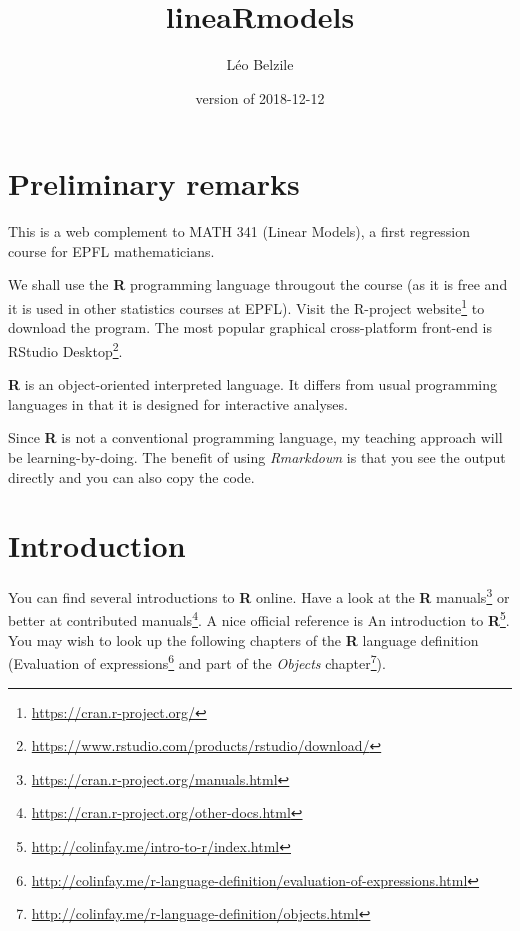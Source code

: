 \documentclass[]{book}
\title{lineaRmodels}
\author{Léo Belzile}
\date{version of 2018-12-12}
\let\rmarkdownfootnote\footnote%
\def\footnote{\protect\rmarkdownfootnote}
\renewcommand{\href}[2]{#2\footnote{\url{#1}}}
\theoremstyle{definition}
\theoremstyle{definition}
\theoremstyle{definition}
\theoremstyle{remark}
\begin{document}
\maketitle

{
\setcounter{tocdepth}{1}
\tableofcontents
}
\hypertarget{preliminary-remarks}{%
\chapter*{Preliminary remarks}\label{preliminary-remarks}}

This is a web complement to MATH 341 (Linear Models), a first regression course for EPFL mathematicians.

We shall use the \textbf{R} programming language througout the course (as it is free and it is used in other statistics courses at EPFL). Visit \href{https://cran.r-project.org/}{the R-project website} to download the program. The most popular graphical cross-platform front-end is \href{https://www.rstudio.com/products/rstudio/download/}{RStudio Desktop}.

\textbf{R} is an object-oriented interpreted language. It differs from usual programming languages in that it is designed for interactive analyses.

Since \textbf{R} is not a conventional programming language, my teaching approach will be learning-by-doing. The benefit of using \emph{Rmarkdown} is that you see the output directly and you can also copy the code.

\newcommand{\bs}[1]{\boldsymbol{#1}}
\newcommand{\Hmat}{\mathbf{H}}
\newcommand{\Mmat}{\mathbf{M}}
\newcommand{\mX}{\mathbf{X}}
\newcommand{\bX}{{\mathbf{X}}}
\newcommand{\bx}{{\mathbf{x}}}
\newcommand{\by}{{\boldsymbol{y}}}
\newcommand{\bY}{{\boldsymbol{Y}}}
\newcommand{\eps}{\varepsilon}
\newcommand{\beps}{\boldsymbol{\varepsilon}}
\newcommand{\bbeta}{\boldsymbol{\beta}}
\newcommand{\hbb}{\hat{\boldsymbol{\beta}}}
\newcommand{\limni}{\lim_{n \ra \infty}}
\newcommand{\Sp}{\mathscr{S}}
\newcommand{\E}[2][]{{\mathsf E}_{#1}\left(#2\right)}
\newcommand{\Va}[2][]{{\mathsf{Var}_{#1}}\left(#2\right)}
\newcommand{\I}[1]{{\mathbf 1}_{#1}}

\hypertarget{introduction}{%
\chapter{Introduction}\label{introduction}}

You can find several introductions to \textbf{R} online. Have a look at the \href{https://cran.r-project.org/manuals.html}{\textbf{R} manuals} or better at \href{https://cran.r-project.org/other-docs.html}{contributed manuals}. A nice official reference is \href{http://colinfay.me/intro-to-r/index.html}{An introduction to \textbf{R}}.
You may wish to look up the following chapters of the \textbf{R} language definition (\href{http://colinfay.me/r-language-definition/evaluation-of-expressions.html}{Evaluation of expressions} and part of the \href{http://colinfay.me/r-language-definition/objects.html}{\emph{Objects} chapter}).
\end{document}

